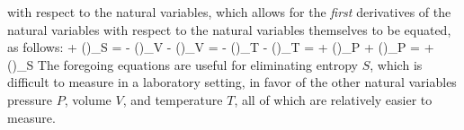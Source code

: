 with respect to the natural variables, which
allows for the {\em first} derivatives of the natural variables with 
respect to the natural variables themselves to be equated, as follows:
\be
 \;\;\implies \;\;
 + \left(\right)_S 
 \;\; = \;\;
 - \left(\right)_V
\ee
\be
 \;\;\implies \;\;
 - \left(\right)_V 
 \;\; = \;\;
 - \left(\right)_T
\ee
\be
 \;\;\implies \;\;
 - \left(\right)_T 
 \;\; = \;\;
 + \left(\right)_P
\ee
\be
 \;\;\implies \;\;
 + \left(\right)_P 
 \;\; = \;\;
 + \left(\right)_S
\ee
The foregoing equations are useful for eliminating entropy $S$, which 
is difficult to measure in a laboratory setting, in favor of the 
other natural variables pressure $P$, volume $V$, and temperature $T$, 
all of which are relatively easier to measure.


